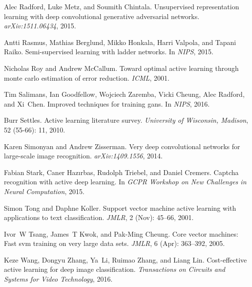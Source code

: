 \documentclass{article} \usepackage{iclr2018_conference,times}
\begin{document}
\begin{thebibliography}{51}
Alec Radford, Luke Metz, and Soumith Chintala.
\newblock Unsupervised representation learning with deep convolutional
  generative adversarial networks.
\newblock \emph{arXiv:1511.06434}, 2015.

Antti Rasmus, Mathias Berglund, Mikko Honkala, Harri Valpola, and Tapani Raiko.
\newblock Semi-supervised learning with ladder networks.
\newblock In \emph{NIPS}, 2015.

Nicholas Roy and Andrew McCallum.
\newblock Toward optimal active learning through monte carlo estimation of
  error reduction.
\newblock \emph{ICML}, 2001.

Tim Salimans, Ian Goodfellow, Wojciech Zaremba, Vicki Cheung, Alec Radford, and
  Xi~Chen.
\newblock Improved techniques for training gans.
\newblock In \emph{NIPS}, 2016.

Burr Settles.
\newblock Active learning literature survey.
\newblock \emph{University of Wisconsin, Madison}, 52
  (55-66): 11, 2010.

Karen Simonyan and Andrew Zisserman.
\newblock Very deep convolutional networks for large-scale image recognition.
\newblock \emph{arXiv:1409.1556}, 2014.

Fabian Stark, Caner Haz{\i}rbas, Rudolph Triebel, and Daniel Cremers.
\newblock Captcha recognition with active deep learning.
\newblock In \emph{GCPR Workshop on New Challenges in Neural Computation},
  2015.

Simon Tong and Daphne Koller.
\newblock Support vector machine active learning with applications to text
  classification.
\newblock \emph{JMLR}, 2 (Nov): 45--66, 2001.

Ivor~W Tsang, James~T Kwok, and Pak-Ming Cheung.
\newblock Core vector machines: Fast svm training on very large data sets.
\newblock \emph{JMLR}, 6 (Apr): 363--392, 2005.

Keze Wang, Dongyu Zhang, Ya~Li, Ruimao Zhang, and Liang Lin.
\newblock Cost-effective active learning for deep image classification.
\newblock \emph{Transactions on Circuits and Systems for Video Technology},
  2016.


\end{thebibliography}
\end{document}

